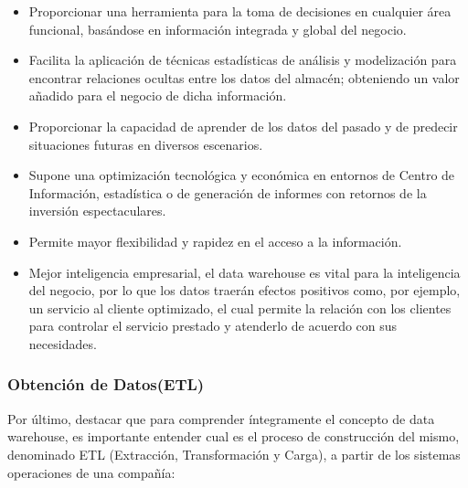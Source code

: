 \documentclass[11pt,a4paper]{article}
\begin{document}
\begin{itemize}
					\item Proporcionar una herramienta para la toma de decisiones en cualquier área funcional, basándose en información integrada y global del negocio.
					\item Facilita la aplicación de técnicas estadísticas de análisis y modelización para encontrar relaciones ocultas entre los datos del almacén; obteniendo un valor añadido para el negocio de dicha información.
					
					\item Proporcionar la capacidad de aprender de los datos del pasado y de predecir situaciones futuras en diversos escenarios.
					
					\item Supone una optimización tecnológica y económica en entornos de Centro de Información, estadística o de generación de informes con retornos de la inversión espectaculares.
					
					\item Permite mayor flexibilidad y rapidez en el acceso a la información.
					
					\item Mejor inteligencia empresarial, el data warehouse es vital para la inteligencia del negocio, por lo que los datos traerán efectos positivos como, por ejemplo, un servicio al cliente optimizado, el cual permite la relación con los clientes para controlar el servicio prestado y atenderlo de acuerdo con sus necesidades.\cite{DWarehouse02:Online}	
				\end{itemize}
			
			\subsubsection{Obtención de Datos(ETL)}
			
			Por último, destacar que para comprender íntegramente el concepto de data warehouse, es importante entender cual es el proceso de construcción del mismo, denominado ETL (Extracción, Transformación y Carga), a partir de los sistemas operaciones de una compañía:
			
\end{document}
